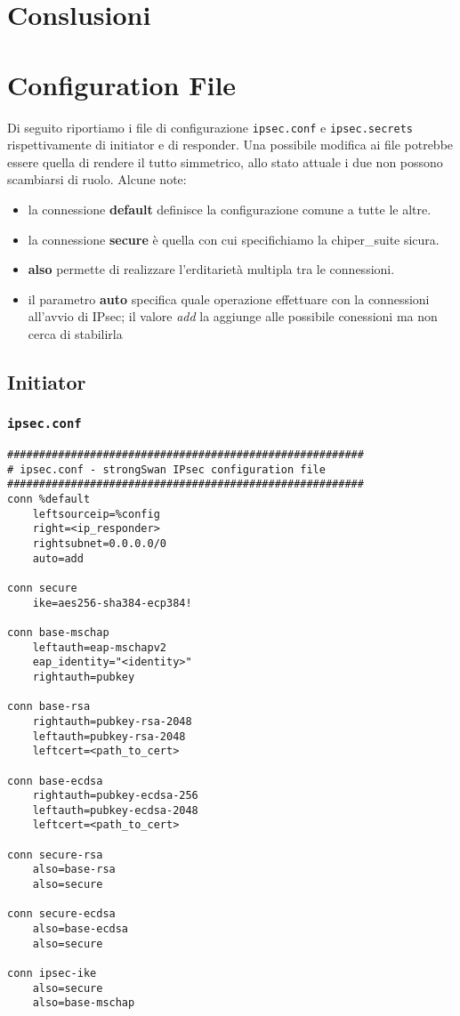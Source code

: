 \documentclass[
10pt, %
a4paper, %
oneside, %
headinclude,footinclude, %
BCOR5mm, %
]{scrartcl}
\begin{document}
\section{Conslusioni}

\newpage

\appendix

\section{Configuration File}
\hypertarget{configuration}{}
Di seguito riportiamo i file di configurazione \lstinline|ipsec.conf| e \lstinline|ipsec.secrets| rispettivamente di 
initiator e di responder. Una possibile modifica ai file potrebbe essere quella di rendere il tutto simmetrico, allo stato 
attuale i due non possono scambiarsi di ruolo. Alcune note:

\begin{itemize}
    \item la connessione \textbf{default} definisce la configurazione comune a tutte le altre.
    \item la connessione \textbf{secure} è quella con cui specifichiamo la chiper\_suite sicura.
    \item \textbf{also} permette di realizzare l'erditarietà multipla tra le connessioni.
    \item il parametro \textbf{auto} specifica quale operazione effettuare con la connessioni all'avvio di IPsec; il valore \textit{add} la aggiunge alle possibile conessioni ma non cerca di stabilirla
\end{itemize}

\subsection{Initiator}

\subsubsection*{\lstinline|ipsec.conf|}
\begin{lstlisting}
########################################################
# ipsec.conf - strongSwan IPsec configuration file
########################################################
conn %default
    leftsourceip=%config
    right=<ip_responder>
    rightsubnet=0.0.0.0/0
    auto=add

conn secure
    ike=aes256-sha384-ecp384!

conn base-mschap
    leftauth=eap-mschapv2
    eap_identity="<identity>"
    rightauth=pubkey

conn base-rsa
    rightauth=pubkey-rsa-2048
    leftauth=pubkey-rsa-2048
    leftcert=<path_to_cert>

conn base-ecdsa
    rightauth=pubkey-ecdsa-256
    leftauth=pubkey-ecdsa-2048
    leftcert=<path_to_cert>

conn secure-rsa
    also=base-rsa
    also=secure

conn secure-ecdsa
    also=base-ecdsa
    also=secure

conn ipsec-ike
    also=secure
    also=base-mschap
\end{lstlisting}
\newpage
\end{document}
